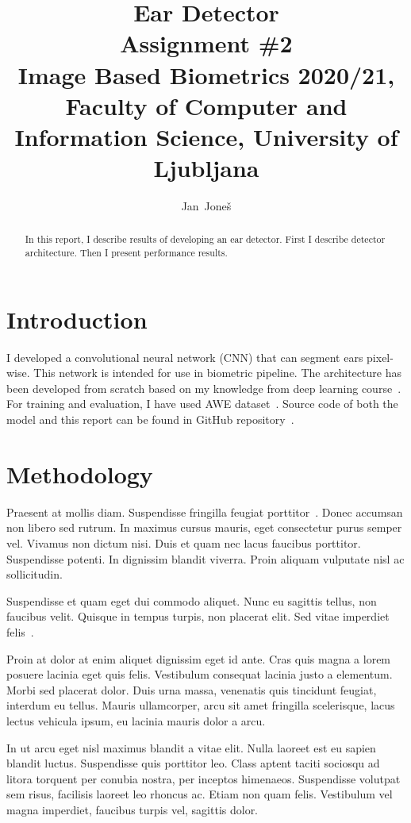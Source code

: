 \documentclass[9pt]{IEEEtran}
\title{\vspace{0ex} %
Ear Detector
\\ \large{Assignment \#2}\\ \normalsize{Image Based Biometrics 2020/21, Faculty of Computer and Information Science, University of Ljubljana}}
\author{ %
Jan~Joneš
\vspace{-4.0ex}
}
\begin{document}
\maketitle

\begin{abstract}
In this report, I describe results of developing an ear detector.
First I describe detector architecture.
Then I present performance results.
\end{abstract}

\section{Introduction}
I developed a convolutional neural network (CNN) that can segment ears pixel-wise.
This network is intended for use in biometric pipeline.
The architecture has been developed from scratch based on my knowledge from deep learning course~\cite{npfl114}.
For training and evaluation, I have used AWE dataset~\cite{awe}.
Source code of both the model and this report can be found in GitHub repository~\cite{repo}.

\section{Methodology}
Praesent at mollis diam. Suspendisse fringilla feugiat porttitor~\cite{neuro2008,neuro2013}. Donec accumsan non libero sed rutrum. In maximus cursus mauris, eget consectetur purus semper vel. Vivamus non dictum nisi. Duis et quam nec lacus faucibus porttitor. Suspendisse potenti. In dignissim blandit viverra. Proin aliquam vulputate nisl ac sollicitudin.

 Suspendisse et quam eget dui commodo aliquet. Nunc eu sagittis tellus, non faucibus velit. Quisque in tempus turpis, non placerat elit. Sed vitae imperdiet felis~\cite{Jain2004,Jain2011}.

Proin at dolor at enim aliquet dignissim eget id ante. Cras quis magna a lorem posuere lacinia eget quis felis. Vestibulum consequat lacinia justo a elementum. Morbi sed placerat dolor. Duis urna massa, venenatis quis tincidunt feugiat, interdum eu tellus. Mauris ullamcorper, arcu sit amet fringilla scelerisque, lacus lectus vehicula ipsum, eu lacinia mauris dolor a arcu.

In ut arcu eget nisl maximus blandit a vitae elit. Nulla laoreet est eu sapien blandit luctus. Suspendisse quis porttitor leo. Class aptent taciti sociosqu ad litora torquent per conubia nostra, per inceptos himenaeos. Suspendisse volutpat sem risus, facilisis laoreet leo rhoncus ac. Etiam non quam felis. Vestibulum vel magna imperdiet, faucibus turpis vel, sagittis dolor.
\end{document}
